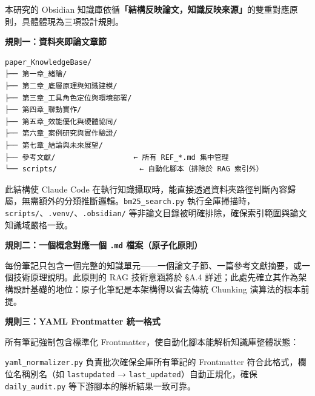 本研究的 Obsidian
知識庫依循\textbf{「結構反映論文，知識反映來源」}的雙重對應原則，具體體現為三項設計規則。

\textbf{規則一：資料夾即論文章節}

\begin{verbatim}
paper_KnowledgeBase/
├── 第一章_緒論/
├── 第二章_底層原理與知識建模/
├── 第三章_工具角色定位與環境部署/
├── 第四章_聯動實作/
├── 第五章_效能優化與硬體協同/
├── 第六章_案例研究與實作驗證/
├── 第七章_結論與未來展望/
├── 參考文獻/                  ← 所有 REF_*.md 集中管理
└── scripts/                   ← 自動化腳本（排除於 RAG 索引外）
\end{verbatim}

此結構使 Claude Code
在執行知識攝取時，能直接透過資料夾路徑判斷內容歸屬，無需額外的分類推斷邏輯。\texttt{bm25\_search.py}
執行全庫掃描時，\texttt{scripts/}、\texttt{.venv/}、\texttt{.obsidian/}
等非論文目錄被明確排除，確保索引範圍與論文知識域嚴格一致。

\textbf{規則二：一個概念對應一個 \texttt{.md} 檔案（原子化原則）}

每份筆記只包含一個完整的知識單元------一個論文子節、一篇參考文獻摘要，或一個技術原理說明。此原則的
RAG 技術意涵將於 §A.4
詳述；此處先確立其作為架構設計基礎的地位：原子化筆記是本架構得以省去傳統
Chunking 演算法的根本前提。

\textbf{規則三：YAML Frontmatter 統一格式}

所有筆記強制包含標準化 Frontmatter，使自動化腳本能解析知識庫整體狀態：

\begin{Shaded}
\begin{Highlighting}[]

\KeywordTok{:}
\KeywordTok{:}
\KeywordTok{:}
\KeywordTok{:}\AttributeTok{ }\KeywordTok{[}\KeywordTok{]}
\KeywordTok{:}
\KeywordTok{:}
\KeywordTok{:}
\KeywordTok{:}
\KeywordTok{:}
\end{Highlighting}
\end{Shaded}

\texttt{yaml\_normalizer.py} 負責批次確保全庫所有筆記的 Frontmatter
符合此格式，欄位名稱別名（如 \texttt{lastupdated} →
\texttt{last\_updated}）自動正規化，確保 \texttt{daily\_audit.py}
等下游腳本的解析結果一致可靠。

